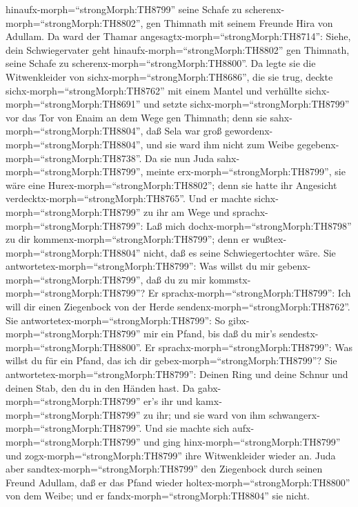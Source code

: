 hinaufx-morph=``strongMorph:TH8799'' seine Schafe zu
scherenx-morph=``strongMorph:TH8802'', gen Thimnath mit seinem Freunde
Hira von Adullam.  Da ward der Thamar
angesagtx-morph=``strongMorph:TH8714'': Siehe, dein Schwiegervater geht
hinaufx-morph=``strongMorph:TH8802'' gen Thimnath, seine Schafe zu
scherenx-morph=``strongMorph:TH8800''.  Da legte sie die
Witwenkleider von sichx-morph=``strongMorph:TH8686'', die sie trug,
deckte sichx-morph=``strongMorph:TH8762'' mit einem Mantel und verhüllte
sichx-morph=``strongMorph:TH8691'' und setzte
sichx-morph=``strongMorph:TH8799'' vor das Tor von Enaim an dem Wege gen
Thimnath; denn sie sahx-morph=``strongMorph:TH8804'', daß Sela war groß
gewordenx-morph=``strongMorph:TH8804'', und sie ward ihm nicht zum Weibe
gegebenx-morph=``strongMorph:TH8738''.  Da sie nun Juda
sahx-morph=``strongMorph:TH8799'', meinte
erx-morph=``strongMorph:TH8799'', sie wäre eine
Hurex-morph=``strongMorph:TH8802''; denn sie hatte ihr Angesicht
verdecktx-morph=``strongMorph:TH8765''.  Und er machte
sichx-morph=``strongMorph:TH8799'' zu ihr am Wege und
sprachx-morph=``strongMorph:TH8799'': Laß mich
dochx-morph=``strongMorph:TH8798'' zu dir
kommenx-morph=``strongMorph:TH8799''; denn er
wußtex-morph=``strongMorph:TH8804'' nicht, daß es seine Schwiegertochter
wäre. Sie antwortetex-morph=``strongMorph:TH8799'': Was willst du mir
gebenx-morph=``strongMorph:TH8799'', daß du zu mir
kommstx-morph=``strongMorph:TH8799''?  Er
sprachx-morph=``strongMorph:TH8799'': Ich will dir einen Ziegenbock von
der Herde sendenx-morph=``strongMorph:TH8762''. Sie
antwortetex-morph=``strongMorph:TH8799'': So
gibx-morph=``strongMorph:TH8799'' mir ein Pfand, bis daß du mir's
sendestx-morph=``strongMorph:TH8800''.  Er
sprachx-morph=``strongMorph:TH8799'': Was willst du für ein Pfand, das
ich dir gebex-morph=``strongMorph:TH8799''? Sie
antwortetex-morph=``strongMorph:TH8799'': Deinen Ring und deine Schnur
und deinen Stab, den du in den Händen hast. Da
gabx-morph=``strongMorph:TH8799'' er's ihr und
kamx-morph=``strongMorph:TH8799'' zu ihr; und sie ward von ihm
schwangerx-morph=``strongMorph:TH8799''.  Und sie machte
sich aufx-morph=``strongMorph:TH8799'' und ging
hinx-morph=``strongMorph:TH8799'' und zogx-morph=``strongMorph:TH8799''
ihre Witwenkleider wieder an.  Juda aber
sandtex-morph=``strongMorph:TH8799'' den Ziegenbock durch seinen Freund
Adullam, daß er das Pfand wieder holtex-morph=``strongMorph:TH8800'' von
dem Weibe; und er fandx-morph=``strongMorph:TH8804'' sie nicht.
